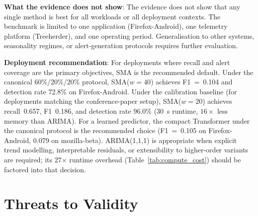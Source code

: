 \documentclass[pdflatex,sn-nature]{sn-jnl}
\theoremstyle{thmstyleone}%
\begin{document}
\textbf{What the evidence does not show}: The evidence does not show that
any single method is best for all workloads or all deployment contexts.
The benchmark is limited to one application (Firefox-Android), one
telemetry platform (Treeherder), and one operating period.
Generalisation to other systems, seasonality regimes, or alert-generation
protocols requires further evaluation.

\textbf{Deployment recommendation}:
For deployments where recall and alert coverage are the primary objectives,
SMA is the recommended default.
Under the canonical 60\%/20\%/20\% protocol, SMA($w=40$) achieves F1~=~0.104
and detection rate 72.8\% on Firefox-Android.
Under the calibration baseline (for deployments matching the conference-paper
setup), SMA($w=20$) achieves recall~0.657, F1~0.186, and detection rate 96.0\%
(30~s runtime, $16\times$ less memory than ARIMA).
For a learned predictor, the compact Transformer under the canonical protocol
is the recommended choice (F1~=~0.105 on Firefox-Android, 0.079 on
mozilla-beta).
ARIMA(1,1,1) is appropriate when explicit trend modelling, interpretable
residuals, or extensibility to higher-order variants are required;
its 27$\times$ runtime overhead (Table~\ref{tab:compute_cost}) should be
factored into that decision.

\section{Threats to Validity}\label{sec:threats}
\end{document}
